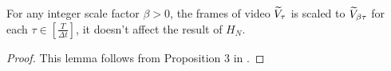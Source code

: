 \begin{lemma}\label{lem:timescale_robustness:informal}
    For any integer scale factor $\beta > 0$, the frames of video $\widetilde{V}_\tau$ is scaled to $\widetilde{V}_{\beta \tau}$ for each $\tau \in [\frac{T}{\Delta t}]$, it doesn’t affect the result of $H_N$.
\end{lemma}
\ifdefined\isarxiv
\else
\vspace{-3mm}
\fi
\begin{proof}
    This lemma follows from Proposition 3 in \cite{gde+20}.
\end{proof}
\ifdefined\isarxiv
\else
\vspace{-6mm}
\fi